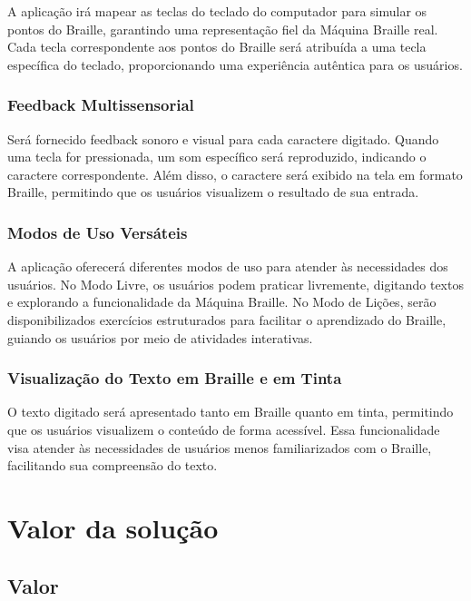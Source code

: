 A aplicação irá mapear as teclas do teclado do computador para simular os pontos do Braille, garantindo uma representação fiel da Máquina Braille real. Cada tecla correspondente aos pontos do Braille será atribuída a uma tecla específica do teclado, proporcionando uma experiência autêntica para os usuários.

\subsubsection{Feedback Multissensorial}

Será fornecido feedback sonoro e visual para cada caractere digitado. Quando uma tecla for pressionada, um som específico será reproduzido, indicando o caractere correspondente. Além disso, o caractere será exibido na tela em formato Braille, permitindo que os usuários visualizem o resultado de sua entrada.

\subsubsection{Modos de Uso Versáteis}

A aplicação oferecerá diferentes modos de uso para atender às necessidades dos usuários. No Modo Livre, os usuários podem praticar livremente, digitando textos e explorando a funcionalidade da Máquina Braille. No Modo de Lições, serão disponibilizados exercícios estruturados para facilitar o aprendizado do Braille, guiando os usuários por meio de atividades interativas.

\subsubsection{Visualização do Texto em Braille e em Tinta}

O texto digitado será apresentado tanto em Braille quanto em tinta, permitindo que os usuários visualizem o conteúdo de forma acessível. Essa funcionalidade visa atender às necessidades de usuários menos familiarizados com o Braille, facilitando sua compreensão do texto.


\section{Valor da solução}

\subsection{Valor}


